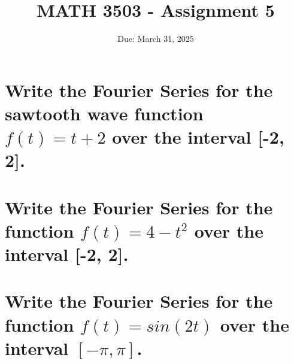 \documentclass{article}
\title{MATH 3503 - Assignment 5}
\date{Due: March 31, 2025}
\begin{document}
\maketitle

\section{Write the Fourier Series for the sawtooth wave function $f(t) = t + 2$ over the interval [-2, 2].}

\section{Write the Fourier Series for the function $f(t) = 4 - t^2$ over the interval [-2, 2].}

\section{Write the Fourier Series for the function $f(t) = sin(2t)$ over the interval $[-\pi, \pi]$.}
\end{document}
